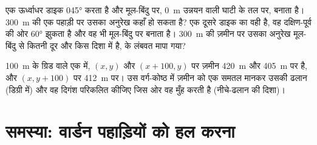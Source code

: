 \begin{exercise}[$\star\star\star$]\label{exo:b1:geological-maps:11}
एक ऊर्ध्वाधर डाइक \ang{045}  करता है और मूल-बिंदु पर, \qty{0}{m} उन्नयन वाली घाटी के तल पर, 
बनाता है। \qty{300}{m} की एक पहाड़ी पर उसका अनुरेख कहाँ हो सकता है? एक दूसरे डाइक का वही  है, वह
दक्षिण-पूर्व की ओर \ang{60} झुकता है और वह भी मूल-बिंदु पर  बनाता है। \qty{300}{m} की ज़मीन पर उसका
अनुरेख मूल-बिंदु से कितनी दूर और किस दिशा में है,  के लंबवत मापा गया?
\end{exercise}

\begin{exercise}[$\star\star\star$]\label{exo:b1:geological-maps:12}
\qty{100}{m} के ग्रिड वाले एक  में, $(x, y)$ और $(x + 100, y)$ पर ज़मीन \qty{420}{m} और
\qty{405}{m} पर है, और $(x, y + 100)$ पर \qty{412}{m} पर। उस वर्ग-कोष्ठ में ज़मीन को एक समतल मानकर उसकी ढलान (डिग्री में)
और वह दिगंश परिकलित कीजिए जिस ओर वह मुँह करती है (नीचे-ढलान की दिशा)।
\end{exercise}

\section{समस्या: वार्डन पहाड़ियों को हल करना}

